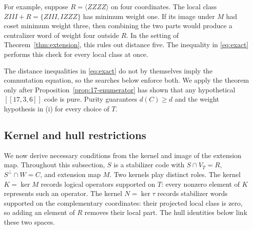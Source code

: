 \documentclass[11pt]{article}
\theoremstyle{definition}
\theoremstyle{remark}
\newcommand{\qc}[1]{[\![#1]\!]}
\begin{document}
For example, suppose \(R=\langle ZZZZ\rangle\) on four coordinates. The
local class \(ZIII+R=\{ZIII,IZZZ\}\) has minimum weight one. If its
image under \(M\) had coset minimum weight three, then combining the two
parts would produce a centralizer word of weight four outside \(R\). In
the setting of Theorem~\ref{thm:extension}, this rules out distance
five. The inequality in \eqref{eq:exact} performs this check for every
local class at once.

The distance inequalities in \eqref{eq:exact} do not by themselves imply
the commutation equation, so the searches below enforce both. We apply
the theorem only after Proposition~\ref{prop:17-enumerator} has shown
that any hypothetical \(\qc{17,3,6}\) code is pure. Purity guarantees
\(d(C)\geq d\) and the weight hypothesis in (i) for every choice of
\(T\).

\subsection{Kernel and hull restrictions}\label{sec:restrictions}

We now derive necessary conditions from the kernel and image of the
extension map. Throughout this subsection, \(S\) is a stabilizer code
with \(S\cap V_T=R\), \(S^\perp\cap W=C\), and extension map \(M\). Two
kernels play distinct roles. The kernel \(K=\ker M\) records logical
operators supported on \(T\): every nonzero element of \(K\) represents
such an operator. The kernel \(N=\ker\tau\) records stabilizer words
supported on the complementary coordinates: their projected local class
is zero, so adding an element of \(R\) removes their local part. The
hull identities below link these two spaces.
\end{document}
